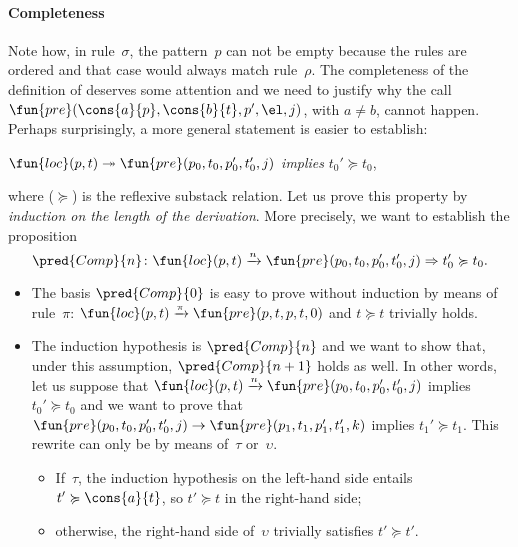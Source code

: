 \paragraph{Completeness}

Note how, in rule~\(\sigma\), the pattern~\(p\) can not be empty
because the rules are ordered and that case would always match
rule~\(\rho\). The completeness of the definition of 
deserves some attention and we need to justify why the call
\(\fun{pre}(\cons{a}{p},\cons{b}{t},p',\el,j)\), with \(a \neq b\),
cannot happen. Perhaps surprisingly, a more general statement is
easier to establish:
\begin{center}
\(\fun{loc}(p,t) \twoheadrightarrow \fun{pre}(p_0,t_0,p_0',t_0',j)\)
\textsl{implies} \(t_0' \succcurlyeq t_0\),
\end{center}
where (\(\succcurlyeq\)) is the reflexive substack relation. Let us
prove this property by \emph{induction on the length of the
  derivation}. More precisely, we want to establish the proposition
\begin{equation*}
\pred{Comp}{n} \colon \fun{loc}(p,t) \xrightarrow{\smash{n}}
\fun{pre}(p_0,t_0,p_0',t_0',j) \Rightarrow t_0' \succcurlyeq t_0.
\index{Comp@\predName{Comp}}
\end{equation*}
\begin{itemize}

  \item The basis \(\pred{Comp}{0}\) is easy to prove without
    induction by means of rule~\(\pi\): \(\fun{loc}(p,t)
    \xrightarrow{\smash{\pi}} \fun{pre}(p,t,p,t,0)\) and \(t
    \succcurlyeq t\) trivially holds.

    \item The induction hypothesis is \(\pred{Comp}{n}\) and we want
      to show that, under this assumption, \(\pred{Comp}{n+1}\) holds
      as well. In other words, let us suppose that \(\fun{loc}(p,t)
      \xrightarrow{\smash{n}} \fun{pre}(p_0,t_0,p_0',t_0',j)\) implies
      \(t_0' \succcurlyeq t_0\) and we want to prove that
      \(\fun{pre}(p_0,t_0,p_0',t_0',j) \rightarrow
      \fun{pre}(p_1,t_1,p_1',t_1',k)\) implies \(t_1' \succcurlyeq
      t_1\). This rewrite can only be by means of~\(\tau\)
      or~\(\upsilon\).
      \begin{itemize}

      \item If~\(\tau\), the induction hypothesis on the
        left\hyp{}hand side entails \(t' \succcurlyeq \cons{a}{t}\),
        so \(t' \succcurlyeq t\) in the right\hyp{}hand side;

      \item otherwise, the right\hyp{}hand side of~\(\upsilon\)
        trivially satisfies \(t' \succcurlyeq t'\).

      \end{itemize}
\end{itemize}

